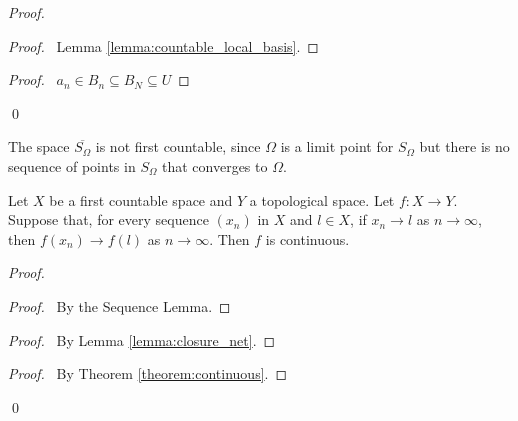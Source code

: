 \begin{proof}
    \pf
    \begin{proof}
        \pf\ Lemma \ref{lemma:countable_local_basis}.
    \end{proof}
    \begin{proof}
        \pf\ $a_n \in B_n \subseteq B_N \subseteq U$
    \end{proof}
    \qed
\end{proof}

\begin{example}
    \label{example:S_Omega_bar_not_first_countable}
    The space $\overline{S_\Omega}$ is not first countable, since $\Omega$
    is a limit point for $S_\Omega$ but there is no sequence of points in
    $S_\Omega$ that converges to $\Omega$.
\end{example}

\begin{theorem}[CC]
    Let $X$ be a first countable space and $Y$ a topological space. Let $f : X \rightarrow Y$. Suppose that, for every sequence $(x_n)$ in $X$ and $l \in X$, if $x_n \rightarrow l$
    as $n \rightarrow \infty$, then $f(x_n) \rightarrow f(l)$ as $n \rightarrow \infty$. Then $f$ is continuous.
\end{theorem}

\begin{proof}
    \pf
    \begin{proof}
        \pf\ By the Sequence Lemma.
    \end{proof}
    \begin{proof}
        \pf\ By Lemma \ref{lemma:closure_net}.
    \end{proof}
    \qedstep
    \begin{proof}
        \pf\ By Theorem \ref{theorem:continuous}.
    \end{proof}
    \qed
\end{proof}

